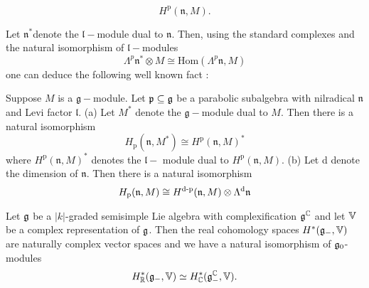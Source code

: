 \begin{equation*}
H^{\text{p}}(\mathfrak{n},M).
\end{equation*}

 Let $\mathfrak{n}^{\ast }$denote the $\mathfrak{l}-$module dual to
$\mathfrak{n}$. Then, using the standard complexes and the natural
isomorphism of $\mathfrak{l}-$modules
\begin{equation*}
\Lambda ^{p}\mathfrak{n}^{\ast }\otimes M\cong \text{Hom}(\Lambda ^{p}%
\mathfrak{n},M)
\end{equation*}%
one can deduce the following well known fact \cite[Section 2]{HS}:

\begin{proposition}
Suppose $M$ is a $\mathfrak{g-}$module. Let $\mathfrak{p}\subseteq \mathfrak{%
g}$ be a parabolic subalgebra with nilradical $\mathfrak{n}$ and Levi factor
$\mathfrak{l}$. \newline
(a) Let $M^{\ast }$ denote the $\mathfrak{g}-$module dual to $M.$ Then there
is a natural isomorphism
\begin{equation*}
H_{\text{p}}(\mathfrak{n},M^{\ast })\cong H^{\text{p}}(\mathfrak{n},M)^{\ast
}
\end{equation*}%
where $H^{\text{p}}(\mathfrak{n},M)^{\ast }$ denotes the $\mathfrak{l-}$%
module dual to $H^{\text{p}}(\mathfrak{n},M)$.\newline
(b) Let d denote the dimension of $\mathfrak{n}$. Then there is a natural
isomorphism
\begin{equation*}
H_{\text{p}}(\mathfrak{n},M)\cong H^{\text{d-p}}(\mathfrak{n},M)\otimes
\Lambda ^{\text{d}}\mathfrak{n}\newline
\end{equation*}
\end{proposition}




\begin{proposition}
 Let $\mathfrak{g}$ be a $|k|$-graded semisimple Lie algebra with complexification $\mathfrak{g}^{\mathbb{C}}$ and let $\mathbb{V}$ be a complex representation of $\mathfrak{g}$. Then the real cohomology spaces $H^*(\mathfrak{g}_-,\mathbb{V})$ are 	naturally complex vector spaces and we have a natural isomorphism of $\mathfrak{g}_0$-modules
 \[
  H_{\mathbb{R}}^*(\mathfrak{g}_-,\mathbb{V}) \simeq H_{\mathbb{C}}^*(\mathfrak{g}_-^{\mathbb{C}},\mathbb{V}).
 \]

\end{proposition}


